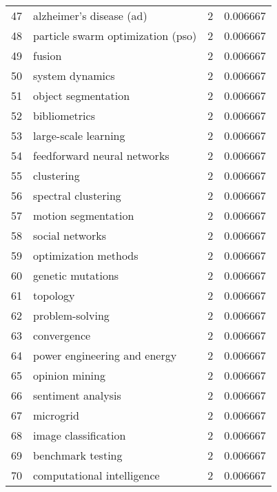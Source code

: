 \begin{tabular}{llrr}
47 &           alzheimer's disease (ad) &           2 &    0.006667 \\
48 &  particle swarm optimization (pso) &           2 &    0.006667 \\
49 &                             fusion &           2 &    0.006667 \\
50 &                    system dynamics &           2 &    0.006667 \\
51 &                object segmentation &           2 &    0.006667 \\
52 &                      bibliometrics &           2 &    0.006667 \\
53 &               large-scale learning &           2 &    0.006667 \\
54 &        feedforward neural networks &           2 &    0.006667 \\
55 &                         clustering &           2 &    0.006667 \\
56 &                spectral clustering &           2 &    0.006667 \\
57 &                motion segmentation &           2 &    0.006667 \\
58 &                    social networks &           2 &    0.006667 \\
59 &               optimization methods &           2 &    0.006667 \\
60 &                  genetic mutations &           2 &    0.006667 \\
61 &                           topology &           2 &    0.006667 \\
62 &                    problem-solving &           2 &    0.006667 \\
63 &                        convergence &           2 &    0.006667 \\
64 &       power engineering and energy &           2 &    0.006667 \\
65 &                     opinion mining &           2 &    0.006667 \\
66 &                 sentiment analysis &           2 &    0.006667 \\
67 &                          microgrid &           2 &    0.006667 \\
68 &               image classification &           2 &    0.006667 \\
69 &                  benchmark testing &           2 &    0.006667 \\
70 &         computational intelligence &           2 &    0.006667 \\

\end{tabular}
